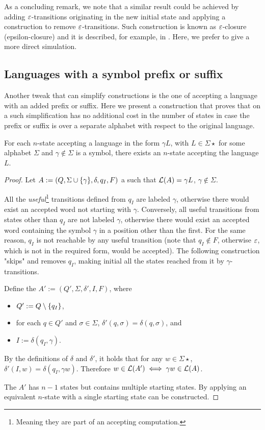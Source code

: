 As a concluding remark, we note that a similar result could be achieved by adding $\varepsilon$-transitions originating in the new initial state and applying a construction to remove $\varepsilon$-transitions.
Such construction is known as $\varepsilon$-closure (epsilon-closure) and it is described, for example, in \cite[Theorem 2.2]{HopUll79}.
Here, we prefer to give a more direct simulation.


\subsection{Languages with a symbol prefix or suffix}
Another tweak that can simplify constructions is the one of accepting a language with an added prefix or suffix.
Here we present a construction that proves that on a \ONFA such simplification has no additional cost in the number of states in case the prefix or suffix is over a separate alphabet with respect to the original language.
\begin{thrm}
	For each $n$-state \ONFA accepting a language in the form $\gamma L$, with $L\in\Sigma\star$ for some alphabet $\Sigma$ and $\gamma\notin\Sigma$ is a symbol, there exists an $n$-state \ONFA accepting the language $L$.
\end{thrm}
\begin{proof}
	Let $A:=(Q,\Sigma\cup\{\gamma\},\delta,q_I,F)$ a \ONFA such that $\mathcal L(A)=\gamma L$, $\gamma\notin\Sigma$.

	All the \emph{useful}\footnote{Meaning they are part of an accepting computation.} transitions defined from $q_I$ are labeled $\gamma$, otherwise there would exist an accepted word not starting with $\gamma$.
	Conversely, all useful transitions from states other than $q_I$ are not labeled $\gamma$, otherwise there would exist an accepted word containing the symbol $\gamma$ in a position other than the first.
	For the same reason, $q_I$ is not reachable by any useful transition (note that $q_I\notin F$, otherwise $\varepsilon$, which is not in the required form, would be accepted).
	The following construction "skips" and removes $q_I$, making initial all the states reached from it by $\gamma$-transitions.

	Define the \ONFA $A':=(Q',\Sigma,\delta',I,F)$, where
	\begin{itemize}
		\item $Q':=Q\setminus\{q_I\}$,
		\item for each $q\in Q'$ and $\sigma\in\Sigma$, $\delta'(q,\sigma)=\delta(q,\sigma)$, and
		\item $I:=\delta(q_I,\gamma)$.
	\end{itemize}

	By the definitions of $\delta$ and $\delta'$, it holds that for any $w\in\Sigma\star$, $\delta'(I,w)=\delta(q_I,\gamma w)$.
	Therefore $w\in\mathcal L(A')\iff \gamma w\in\mathcal L(A)$.

	The \ONFA $A'$ has $n-1$ states but contains multiple starting states. By applying  an equivalent $n$-state \ONFA with a single starting state can be constructed.
\end{proof}
